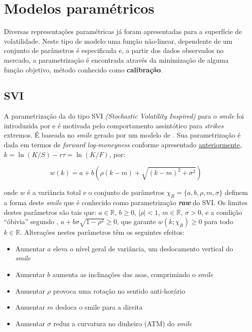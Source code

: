 \documentclass[]{book}
\providecommand{\tightlist}{%
  \setlength{\itemsep}{0pt}\setlength{\parskip}{0pt}}
\theoremstyle{definition}
\theoremstyle{definition}
\theoremstyle{definition}
\theoremstyle{remark}
\begin{document}
\hypertarget{modelos-parametricos}{%
\section{Modelos paramétricos}\label{modelos-parametricos}}

Diversas representações paramétricas já foram apresentadas para a superfície de volatilidade. Neste tipo de modelo uma função não-linear, dependente de um conjunto de parâmetros é especificada e, a partir dos dados observados no mercado, a parametrização é encontrada através da minimização de alguma função objetivo, método conhecido como \textbf{calibração}.

\hypertarget{sec:svi}{%
\subsection{SVI}\label{sec:svi}}

A parametrização da do tipo SVI \emph{(Stochastic Volatility Inspired)} para o \emph{smile} foi introduzida por \citet{Gatheral2004} e é motivada pelo comportamento assintótico para \emph{strikes} extremos. É baseada no \emph{smile} gerado por um modelo de \citet{Heston1993}. Sua parametrização é dada em termos de \emph{forward log-moneyness} conforme apresentado \protect\hyperlink{smile}{anteriormente}, \(k=\ln(K/S)-r\tau=\ln(K/F)\), por:

\begin{equation}
w(k) = a + b\left(\rho(k-m)+\sqrt{(k-m)^2 + \sigma^2}\right)
\label{eq:rawsvi}
\end{equation}

onde \(w\) é a variância total e o conjunto de parâmetros \(\chi_R = \{a, b, \rho, m, \sigma\}\) definem a forma deste \emph{smile} que é conhecido como parametrização \textbf{\emph{raw}} do SVI. Os limites destes parâmetros são tais que: \(a \in \mathbb R\), \(b \geq 0\), \(|\rho| < 1\), \(m \in \mathbb R\), \(\sigma > 0\), e a condição ``óbivia'' segundo \citet{Gatheral2014}, \(a+b \sigma\sqrt{1 − \rho^2} \geq 0\), que garante \(w(k; \chi_R) \geq 0\) para todo \(k \in \mathbb R\). Alterações nestes parâmetros têm os seguintes efeitos:

\begin{itemize}
\tightlist
\item
  Aumentar \(a\) eleva o nível geral de variância, um deslocamento vertical do \emph{smile}
\item
  Aumentar \(b\) aumenta as inclinações das asas, comprimindo o \emph{smile}
\item
  Aumentar \(\rho\) provoca uma rotação no sentido anti-horário
\item
  Aumentar \(m\) desloca o smile para a direita
\item
  Aumentar \(\sigma\) reduz a curvatura no dinheiro (ATM) do \emph{smile}
\end{itemize}
\end{document}

